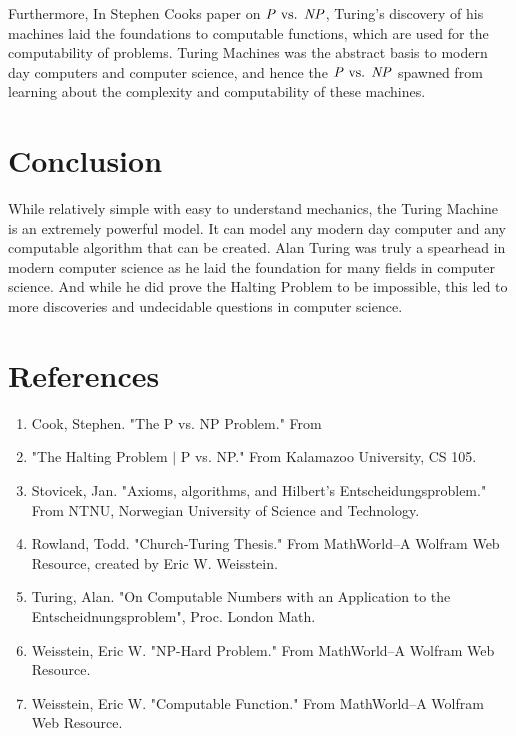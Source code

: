 \documentclass[12pt]{article}
\begin{document}
Furthermore, In Stephen Cooks paper on $\text{\textit{P} vs. \textit{NP}}$, Turing's discovery of his machines laid the foundations to computable functions, which are used for the computability of problems. Turing Machines was the abstract basis to modern day computers and computer science, and hence the $\text{\textit{P} vs. \textit{NP}}$ spawned from learning about the complexity and computability of these machines.

\section{Conclusion}

While relatively simple with easy to understand mechanics, the Turing Machine is an extremely powerful model. It can model any modern day computer and any computable algorithm that can be created. Alan Turing was truly a spearhead in modern computer science as he laid the foundation for many fields in computer science. And while he did prove the Halting Problem to be impossible, this led to more discoveries and undecidable questions in computer science.


\section*{References}
\begin{enumerate}
\item Cook, Stephen. "The P vs. NP Problem." From 
\item "The Halting Problem $\mid$ P vs. NP." From Kalamazoo University, CS 105.
\item Stovicek, Jan. "Axioms, algorithms, and Hilbert's Entscheidungsproblem." From NTNU, Norwegian University of Science and Technology.
\item Rowland, Todd. "Church-Turing Thesis." From MathWorld--A Wolfram Web Resource, created by Eric W. Weisstein.
\item Turing, Alan. "On Computable Numbers with an Application to the Entscheidnungsproblem", Proc. London Math.
\item Weisstein, Eric W. "NP-Hard Problem." From MathWorld--A Wolfram Web Resource.
\item Weisstein, Eric W. "Computable Function." From MathWorld--A Wolfram Web Resource.

\end{enumerate}
\end{document}

